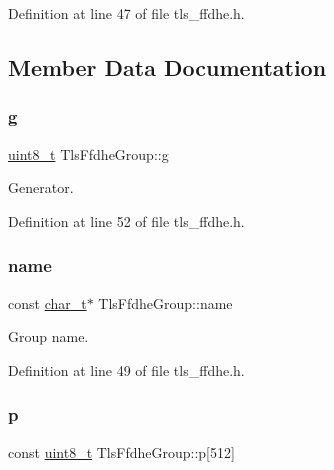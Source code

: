 Definition at line 47 of file tls\+\_\+ffdhe.\+h.



\subsection{Member Data Documentation}
\mbox{\label{structTlsFfdheGroup_a1363d7726f139d3ba42341876c5194cd}} 
\subsubsection{\texorpdfstring{g}{g}}
{\footnotesize\ttfamily \hyperlink{stdint_8h_aba7bc1797add20fe3efdf37ced1182c5}{uint8\+\_\+t} Tls\+Ffdhe\+Group\+::g}



Generator. 



Definition at line 52 of file tls\+\_\+ffdhe.\+h.

\mbox{\label{structTlsFfdheGroup_aa3685cfc2a3493af1eb106f2f58f8b67}} 
\subsubsection{\texorpdfstring{name}{name}}
{\footnotesize\ttfamily const \hyperlink{compiler__port_8h_a40bb5262bf908c328fbcfbe5d29d0201}{char\+\_\+t}$\ast$ Tls\+Ffdhe\+Group\+::name}



Group name. 



Definition at line 49 of file tls\+\_\+ffdhe.\+h.

\mbox{\label{structTlsFfdheGroup_a3172f750e41a55b2d7ebce0fcb5d6702}} 
\subsubsection{\texorpdfstring{p}{p}}
{\footnotesize\ttfamily const \hyperlink{stdint_8h_aba7bc1797add20fe3efdf37ced1182c5}{uint8\+\_\+t} Tls\+Ffdhe\+Group\+::p\mbox{[}512\mbox{]}}



